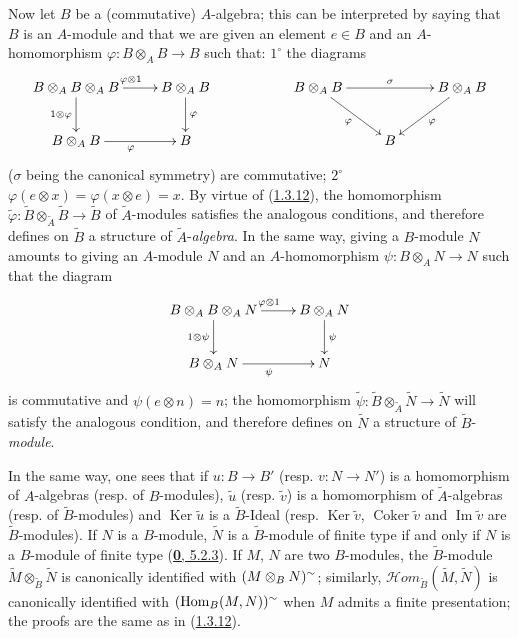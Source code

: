 \begin{env}[1.3.13]
\label{I.1.3.13}
Now let $B$ be a (commutative) $A$-algebra; this can be interpreted by
saying that $B$ is an $A$-module and that we are given an element $e\in B$
and an $A$-homomorphism
$\varphi:B\otimes_A B\to B$ such that: $1^\circ$ the diagrams
\[
  \xymatrix{
    B\otimes_A B\otimes_A B\ar[r]^{\varphi\otimes 1}
      \ar[d]_{1\otimes\varphi} &
    B\otimes_A B\ar[d]^\varphi & &
    B\otimes_A B\ar[rr]^\sigma\ar[rd]_\varphi & &
    B\otimes_A B\ar[dl]^\varphi\\
    B\otimes_A B\ar[r]_\varphi &
    B & & & B
  }
\]
($\sigma$ being the canonical symmetry) are commutative; $2^\circ$
$\varphi(e\otimes x)=\varphi(x\otimes e)=x$. By virtue of
(\hyperref[I.1.3.12]{1.3.12}), the homomorphism
$\widetilde{\varphi}:\widetilde{B}\otimes_{\widetilde{A}}\widetilde{B}
\to\widetilde{B}$ of $\widetilde{A}$-modules satisfies the analogous
conditions, and therefore defines on $\widetilde{B}$ a structure of
$\widetilde{A}$-\emph{algebra}. In the same way, giving a $B$-module $N$
amounts to giving an $A$-module $N$ and an $A$-homomorphism
$\psi:B\otimes_A N\to N$ such that the diagram
\[
  \xymatrix{
    B\otimes_A B\otimes_A N\ar[r]^{\varphi\otimes 1}
      \ar[d]_{1\otimes\psi} &
    B\otimes_A N\ar[d]^\psi\\
    B\otimes_A N\ar[r]_\psi & N
  }
\]
is commutative and $\psi(e\otimes n)=n$; the homomorphism
$\widetilde{\psi}:\widetilde{B}\otimes_{\widetilde{A}}\widetilde{N}
\to\widetilde{N}$ will satisfy the analogous condition, and therefore
defines on $\widetilde{N}$ a structure of $\widetilde{B}$-\emph{module}.

In the same way, one sees that if $u:B\to B'$ (resp. $v:N\to N'$) is a
homomorphism of $A$-algebras (resp. of $B$-modules), $\widetilde{u}$
(resp. $\widetilde{v}$) is a homomorphism of $\widetilde{A}$-algebras
(resp. of $\widetilde{B}$-modules) and $\operatorname{Ker}\widetilde{u}$ is
a $\widetilde{B}$-Ideal (resp. $\operatorname{Ker}\widetilde{v}$,
$\operatorname{Coker}\widetilde{v}$ and $\operatorname{Im}\widetilde{v}$
are $\widetilde{B}$-modules). If $N$ is a $B$-module, $\widetilde{N}$ is
a $\widetilde{B}$-module of finite type if and only if $N$ is a
$B$-module of finite type (\hyperref[0.5.2.3]{\textbf{0}, 5.2.3}).
If $M$, $N$ are two $B$-modules, the $\widetilde{B}$-module
$\widetilde{M}\otimes_{\widetilde{B}}\widetilde{N}$ is canonically
identified with $(M\otimes_B N)^{\sim}$; similarly,
$\mathscr{H}\!om_{\widetilde{B}}(\widetilde{M},\widetilde{N})$ is
canonically identified with $(\operatorname{Hom}_B(M,N))^{\sim}$ when
$M$ admits a finite presentation; the proofs are the same as in
(\hyperref[I.1.3.12]{1.3.12}).


\end{env}
